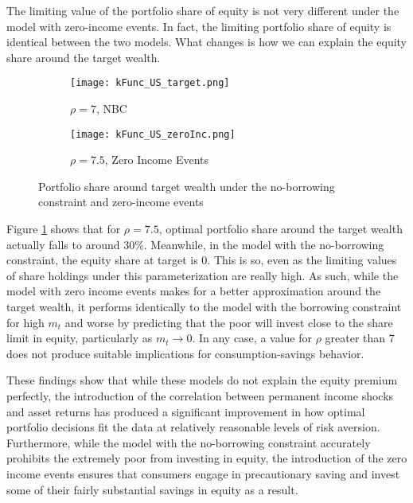 The limiting value of the portfolio share of equity is not very different under the model with zero-income events. In fact, the limiting portfolio share of equity is identical between the two models. What changes is how we can explain the equity share around the target wealth.

\begin{figure}[h]
    \centering
    \begin{subfigure}{0.49\textwidth}
        \centering
        \texttt{[image: kFunc\_US\_target.png]}
        \caption{$\rho = 7$, NBC}
    \end{subfigure}
    \begin{subfigure}{0.49\textwidth}
        \centering
        \texttt{[image: kFunc\_US\_zeroInc.png]}
        \caption{$\rho = 7.5$, Zero Income Events}
    \end{subfigure}
    \caption{Portfolio share around target wealth under the no-borrowing constraint and zero-income events}
    \label{fig:US_zeroInc_target}
\end{figure}

Figure \ref{fig:US_zeroInc_target} shows that for $\rho = 7.5$, optimal portfolio share around the target wealth actually falls to around 30\%. Meanwhile, in the model with the no-borrowing constraint, the equity share at target is 0. This is so, even as the limiting values of share holdings under this parameterization are really high. As such, while the model with zero income events makes for a better approximation around the target wealth, it performs identically to the model with the borrowing constraint for high $m_t$ and worse by predicting that the poor will invest close to the share limit in equity, particularly as $m_t \to 0$. In any case, a value for $\rho$ greater than 7 does not produce suitable implications for consumption-savings behavior.

These findings show that while these models do not explain the equity premium perfectly, the introduction of the correlation between permanent income shocks and asset returns has produced a significant improvement in how optimal portfolio decisions fit the data at relatively reasonable levels of risk aversion. Furthermore, while the model with the no-borrowing constraint accurately prohibits the extremely poor from investing in equity, the introduction of the zero income events ensures that consumers engage in precautionary saving and invest some of their fairly substantial savings in equity as a result.
